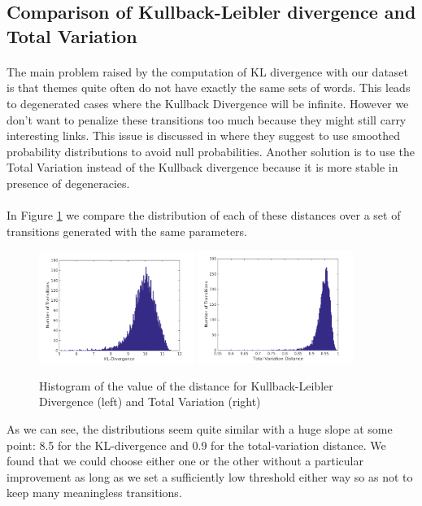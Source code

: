 \subsection{Comparison of Kullback-Leibler divergence and Total Variation}

\paragraph{}
The main problem raised by the computation of KL divergence with our dataset is that themes quite often do not have exactly the same sets of words. This leads to degenerated cases where the Kullback Divergence will be infinite. However we don't want to penalize these transitions too much because they might still carry interesting links. This issue is discussed in \cite{de2010grammatical} where they suggest to use smoothed probability distributions to avoid null probabilities. Another solution is to use the Total Variation instead of the Kullback divergence because it is more stable in presence of degeneracies.

\paragraph{}
In Figure \ref{fig:distancecomparison} we compare the distribution of each of these distances over a set of transitions generated with the same parameters.
\begin{figure}[H]
\begin{center}
	\label{fig:distancecomparison}
	\includegraphics[width=0.45\textwidth]{images/divergence}
	\includegraphics[width=0.45\textwidth]{images/totalvariation}
	\caption{Histogram of the value of the distance for Kullback-Leibler Divergence (left) and Total Variation (right)}
\end{center}
\end{figure}
As we can see, the distributions seem quite similar with a huge slope at some point: 8.5 for the KL-divergence and 0.9 for the total-variation distance. We found that we could choose either one or the other without a particular improvement as long as we set a sufficiently low threshold either way so as not to keep many meaningless transitions.


